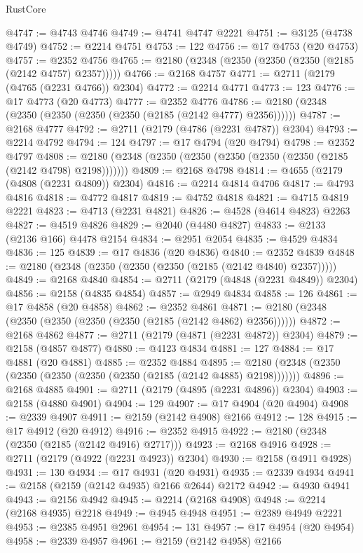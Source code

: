 \begin{lexlean}{RustCore}
\begin{coremodule}
@4747 := @4743 @4746
@4749 := @4741 @4747 @2221
@4751 := @3125 (@4738 @4749)
@4752 := @2214 @4751
@4753 := 122
@4756 := @17 @4753 (@20 @4753)
@4757 := @2352 @4756
@4765 := @2180 (@2348 (@2350 (@2350 (@2350 (@2185 (@2142 @4757) @2357)))))
@4766 := @2168 @4757
@4771 := @2711 (@2179 (@4765 (@2231 @4766)) @2304)
@4772 := @2214 @4771
@4773 := 123
@4776 := @17 @4773 (@20 @4773)
@4777 := @2352 @4776
@4786 := @2180 (@2348 (@2350 (@2350 (@2350 (@2350 (@2185 (@2142 @4777) @2356))))))
@4787 := @2168 @4777
@4792 := @2711 (@2179 (@4786 (@2231 @4787)) @2304)
@4793 := @2214 @4792
@4794 := 124
@4797 := @17 @4794 (@20 @4794)
@4798 := @2352 @4797
@4808 := @2180 (@2348 (@2350 (@2350 (@2350 (@2350 (@2350 (@2185 (@2142 @4798) @2198)))))))
@4809 := @2168 @4798
@4814 := @4655 (@2179 (@4808 (@2231 @4809)) @2304)
@4816 := @2214 @4814 @4706
@4817 := @4793 @4816
@4818 := @4772 @4817
@4819 := @4752 @4818
@4821 := @4715 @4819 @2221
@4823 := @4713 (@2231 @4821)
@4826 := @4528 (@4614 @4823) @2263
@4827 := @4519 @4826
@4829 := @2040 (@4480 @4827)
@4833 := @2133 (@2136 @166) @4478 @2154
@4834 := @2951 @2054
@4835 := @4529 @4834
@4836 := 125
@4839 := @17 @4836 (@20 @4836)
@4840 := @2352 @4839
@4848 := @2180 (@2348 (@2350 (@2350 (@2350 (@2185 (@2142 @4840) @2357)))))
@4849 := @2168 @4840
@4854 := @2711 (@2179 (@4848 (@2231 @4849)) @2304)
@4856 := @2158 (@4835 @4854)
@4857 := @2949 @4834
@4858 := 126
@4861 := @17 @4858 (@20 @4858)
@4862 := @2352 @4861
@4871 := @2180 (@2348 (@2350 (@2350 (@2350 (@2350 (@2185 (@2142 @4862) @2356))))))
@4872 := @2168 @4862
@4877 := @2711 (@2179 (@4871 (@2231 @4872)) @2304)
@4879 := @2158 (@4857 @4877)
@4880 := @4123 @4834
@4881 := 127
@4884 := @17 @4881 (@20 @4881)
@4885 := @2352 @4884
@4895 := @2180 (@2348 (@2350 (@2350 (@2350 (@2350 (@2350 (@2185 (@2142 @4885) @2198)))))))
@4896 := @2168 @4885
@4901 := @2711 (@2179 (@4895 (@2231 @4896)) @2304)
@4903 := @2158 (@4880 @4901)
@4904 := 129
@4907 := @17 @4904 (@20 @4904)
@4908 := @2339 @4907
@4911 := @2159 (@2142 @4908) @2166
@4912 := 128
@4915 := @17 @4912 (@20 @4912)
@4916 := @2352 @4915
@4922 := @2180 (@2348 (@2350 (@2185 (@2142 @4916) @2717)))
@4923 := @2168 @4916
@4928 := @2711 (@2179 (@4922 (@2231 @4923)) @2304)
@4930 := @2158 (@4911 @4928)
@4931 := 130
@4934 := @17 @4931 (@20 @4931)
@4935 := @2339 @4934
@4941 := @2158 (@2159 (@2142 @4935) @2166 @2644) @2172
@4942 := @4930 @4941
@4943 := @2156 @4942
@4945 := @2214 (@2168 @4908)
@4948 := @2214 (@2168 @4935) @2218
@4949 := @4945 @4948
@4951 := @2389 @4949 @2221
@4953 := @2385 @4951 @2961
@4954 := 131
@4957 := @17 @4954 (@20 @4954)
@4958 := @2339 @4957
@4961 := @2159 (@2142 @4958) @2166

\end{coremodule}
\end{lexlean}
